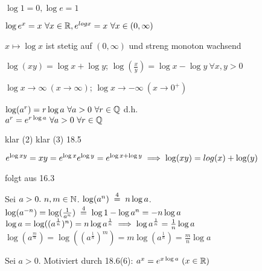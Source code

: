 \documentclass[a4paper,oneside,DIV15,BCOR12mm]{scrbook}
\begin{document}
\begin{eigenschaften}


\begin{liste}
\item $\log 1 = 0, \log e = 1$
\item $\log e^x = x\ \forall x \in \mathbb{R}, e^{log x}=x\ \forall x \in (0, \infty)$
\item $x \mapsto \log x$ ist stetig auf $(0, \infty)$ und streng monoton wachsend
\item $\log(xy) = \log x + \log y$; $\log(\frac{x}{y})=\log x - \log y\ \forall x,y > 0$
\item $\log x \to \infty\ (x \to \infty)$; $\log x \to -\infty\ (x \to 0^+)$
\item $\log(a^r) = r \log a\ \forall a > 0\ \forall r \in \MdQ$ d.h.\\
$a^r = e^{r \log a}\ \forall a > 0\ \forall r \in \mathbb{Q}$
\end{liste}

\begin{beweise}
\item klar (2) klar (3) 18.5
\setcounter{enumi}{3}
\item $e^{\log{xy}}=xy = e^{\log x}e^{\log y}=e^{\log x + \log y} \implies \log(xy) = log(x) + \log(y)$
\item folgt aus 16.3
\item Sei $a>0.\ n, m \in \mathbb{N}$. $\log(a^n) \gleichwegen{4} n \log a$. $\log(a^{-n})=\log(\frac{1}{a^n}) \gleichwegen{4} \log 1 - \log a^n = -n \log a$\\
$\log a = \log((a^\frac{1}{n})^n)=n \log a^\frac{1}{n} \implies \log a^\frac{1}{n}=\frac{1}{n} \log a$\\
$\log(a^\frac{m}{n}) = \log((a^{\frac{1}{n}})^m) = m \log(a^{\frac{1}{n}})=\frac{m}{n}\log a$
\end{beweise}

\end{eigenschaften}

\begin{definition}
Sei $a>0$. Motiviert durch 18.6(6): $a^x = e^{x\log a}\ (x\in\MdR)$
\end{definition}
\end{document}
